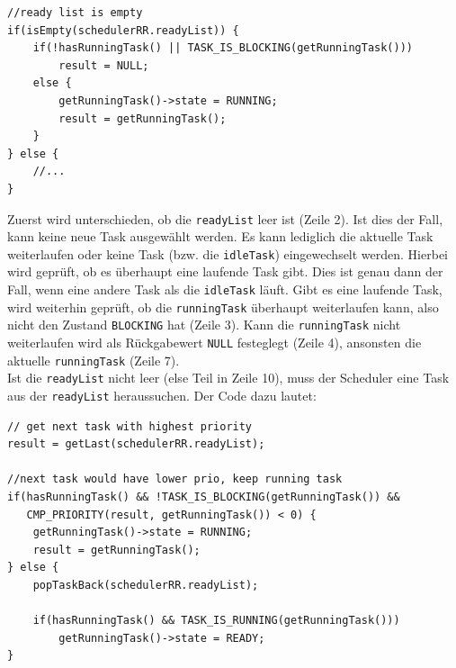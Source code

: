 \documentclass[fontsize=12pt, toc=bibliography, notitlepage]{scrreprt}
\begin{document}
\begin{lstlisting}[title=schedulerRR.c]
//ready list is empty
if(isEmpty(schedulerRR.readyList)) {
	if(!hasRunningTask() || TASK_IS_BLOCKING(getRunningTask()))
		result = NULL;
	else {
		getRunningTask()->state = RUNNING;
		result = getRunningTask();
	}
} else {
	//...
}
\end{lstlisting}

Zuerst wird unterschieden, ob die \lstinline$readyList$ leer ist (Zeile 2). Ist dies der Fall, kann keine neue Task ausgewählt werden. Es kann lediglich die aktuelle Task weiterlaufen oder keine Task (bzw. die \lstinline$idleTask$) eingewechselt werden. Hierbei wird geprüft, ob es überhaupt eine laufende Task gibt. Dies ist genau dann der Fall, wenn eine andere Task als die \lstinline$idleTask$ läuft. Gibt es eine laufende Task, wird weiterhin geprüft, ob die \lstinline$runningTask$ überhaupt weiterlaufen kann, also nicht den Zustand \lstinline$BLOCKING$ hat (Zeile 3). Kann die \lstinline$runningTask$ nicht weiterlaufen wird als Rückgabewert \lstinline$NULL$ festeglegt (Zeile 4), ansonsten die aktuelle \lstinline$runningTask$ (Zeile 7).\\
Ist die \lstinline$readyList$ nicht leer (else Teil in Zeile 10), muss der Scheduler eine Task aus der \lstinline$readyList$ heraussuchen. Der Code dazu lautet:

\begin{lstlisting}[title=schedulerRR.c]
// get next task with highest priority
result = getLast(schedulerRR.readyList);

//next task would have lower prio, keep running task
if(hasRunningTask() && !TASK_IS_BLOCKING(getRunningTask()) &&
   CMP_PRIORITY(result, getRunningTask()) < 0) {
	getRunningTask()->state = RUNNING;
	result = getRunningTask();
} else {
	popTaskBack(schedulerRR.readyList);
	
	if(hasRunningTask() && TASK_IS_RUNNING(getRunningTask()))
		getRunningTask()->state = READY;
}
\end{lstlisting}
\end{document}
